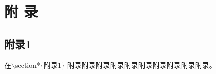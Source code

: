 \chapter*{附\texorpdfstring{\qquad}{} 录}
\thispagestyle{main}

\section*{附录1}
在$\backslash$section*$\{$附录1$\}$
附录附录附录附录附录附录附录附录附录附录。